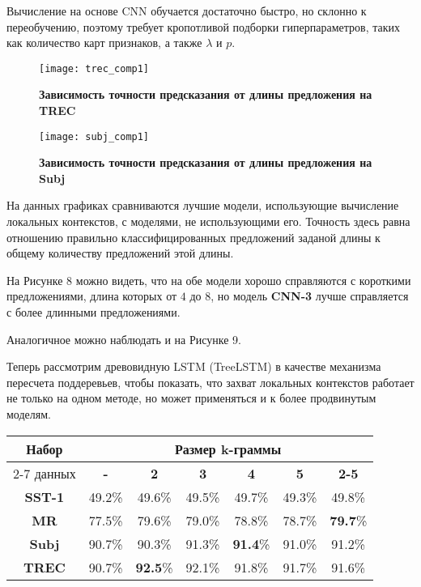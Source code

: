 Вычисление на основе CNN обучается достаточно быстро, но склонно к переобучению, поэтому требует кропотливой подборки гиперпараметров, таких как количество карт признаков, а также $\lambda$ и $p$.

\begin{figure}[H]
\texttt{[image: trec\_comp1]}
\caption{\textbf{Зависимость точности предсказания от длины предложения на TREC}}
\label{fig:context_ex}
\end{figure}

\begin{figure}[H]
\texttt{[image: subj\_comp1]}
\caption{\textbf{Зависимость точности предсказания от длины предложения на Subj}}
\label{fig:context_ex}
\end{figure}

\vspace{20mm}

На данных графиках сравниваются лучшие модели, использующие вычисление локальных контекстов, с моделями, не использующими его. Точность здесь равна отношению правильно классифицированных предложений заданой длины к общему количеству предложений этой длины. 

На Рисунке 8 можно видеть, что на обе модели хорошо справляются с короткими предложениями, длина которых от $4$ до $8$, но модель \textbf{CNN-3} лучше справляется с более длинными предложениями.

Аналогичное можно наблюдать и на Рисунке 9.

Теперь рассмотрим  древовидную LSTM (TreeLSTM) в качестве механизма пересчета поддеревьев, 
чтобы показать, что захват локальных контекстов работает не только на одном методе, 
но может применяться и к более продвинутым моделям.

\vspace{5mm}
\begin{minipage}{\linewidth}
 \label{tab:title} 
\begin{tabular}{|c|c|c|c|c|c|c|}
\hline
\multirow{2}{*}{Набор}   &                \multicolumn{6}{c|}{Размер k-граммы} \\ \cline{2-7} 
     данных              & \textbf{-} & \textbf{2} & \textbf{3} & \textbf{4} & \textbf{5} & \textbf{2-5} \\ \hline
\textbf{SST-1}           & 49.2\%     &  49.6\%    & 49.5\%     & 49.7\%     & 49.3\%     & 49.8\%  \\ \hline
\textbf{MR}              & 77.5\%     &  79.6\%    & 79.0\%     & 78.8\%     & 78.7\%     & \textbf{79.7}\% \\\hline
\textbf{Subj}            & 90.7\%     &  90.3\%    & 91.3\%     &\textbf{91.4}\%& 91.0\%     &  91.2\% \\\hline
\textbf{TREC}            & 90.7\%     &  \textbf{92.5}\%    & 92.1\%     & 91.8\%     & 91.7\%     &  91.6\% \\\hline
\end{tabular}
\end{minipage}
\vspace{5mm}

